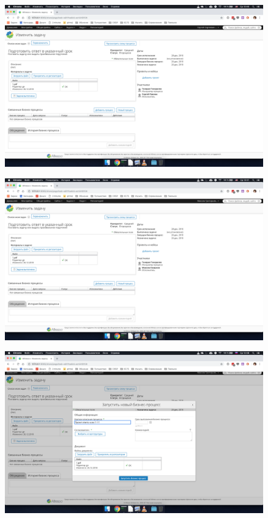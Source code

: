 \begin{figure}[H]
	\centering
	\includegraphics[width=.8\textwidth]{images/7.png}
\end{figure}

\begin{figure}[H]
	\centering
	\includegraphics[width=.8\textwidth]{images/8.png}
\end{figure}

\begin{figure}[H]
	\centering
	\includegraphics[width=.8\textwidth]{images/9.png}
\end{figure}

